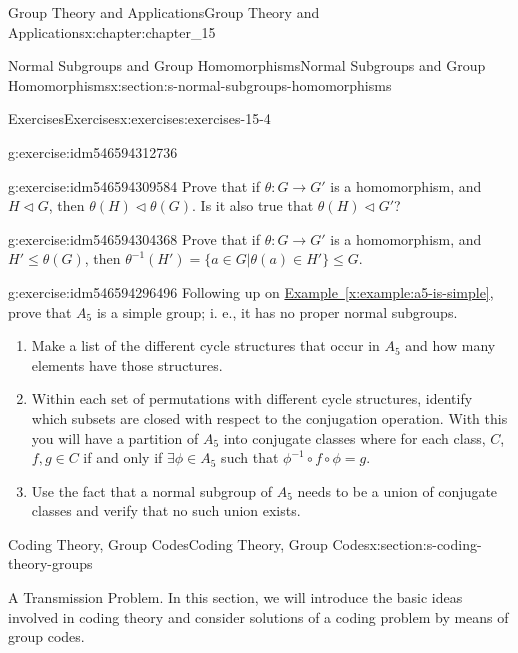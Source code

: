 \documentclass[oneside,10pt,]{book}
\newcommand{\xreffont}{\relax}
\numberwithin{equation}{section}
\begin{document}
\begin{chapterptx}{Group Theory and Applications}{}{Group Theory and Applications}{}{}{x:chapter:chapter_15}
\begin{sectionptx}{Normal Subgroups and Group Homomorphisms}{}{Normal Subgroups and Group Homomorphisms}{}{}{x:section:s-normal-subgroups-homomorphisms}
\begin{exercises-subsection}{Exercises}{}{Exercises}{}{}{x:exercises:exercises-15-4}
\begin{divisionexercise}{7}{}{}{g:exercise:idm546594312736}
\end{divisionexercise}%
\begin{divisionexercise}{8}{}{}{g:exercise:idm546594309584}%
Prove that if \(\theta : G\rightarrow G'\) is a homomorphism, and \(H\triangleleft G\), then \(\theta(H) \triangleleft  \theta(G)\). Is it also true that \(\theta(H) \triangleleft  G'\)?%
\end{divisionexercise}%
\begin{divisionexercise}{9}{}{}{g:exercise:idm546594304368}%
Prove that if \(\theta : G \rightarrow  G'\) is a homomorphism, and \(H' \leq  \theta(G)\), then \(\theta^{-1}(H') =\{a\in G| \theta
(a)\in H'\}\leq  G\).%
\end{divisionexercise}%
\begin{divisionexercise}{10}{}{}{g:exercise:idm546594296496}%
Following up on \hyperref[x:example:a5-is-simple]{Example~{\xreffont\ref{x:example:a5-is-simple}}},  prove that \(A_5\) is a simple group; i. e., it has no proper normal subgroups.%
\begin{enumerate}[label=(\alph*)]
\item{}Make a list of  the different cycle structures that occur in \(A_5\) and how many elements have those structures.%
\item{}Within each set of permutations with different cycle structures, identify which subsets are closed with respect to the conjugation operation. With this you will have a partition of \(A_5\) into conjugate classes where for each class, \(C\), \(f, g\in  C\)   if and only if   \(\exists  \phi  \in A_5\)  such that  \(\phi ^{-1}\circ f\circ  \phi  = g\).%
\item{}Use the fact that a normal subgroup of \(A_5\) needs to be a union of conjugate classes and verify that no such union exists.%
\end{enumerate}
%
\end{divisionexercise}%
\end{exercises-subsection}
\end{sectionptx}
%
%
\typeout{************************************************}
\typeout{************************************************}
%
\begin{sectionptx}{Coding Theory, Group Codes}{}{Coding Theory, Group Codes}{}{}{x:section:s-coding-theory-groups}
%
%
\begin{introduction}{A Transmission Problem.}%
In this section, we will introduce the basic ideas involved in coding theory and consider solutions of a coding problem by means of group codes.%

\end{introduction}
\end{sectionptx}
\end{chapterptx}
\end{document}
